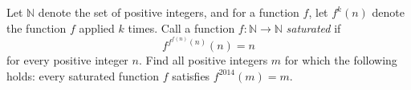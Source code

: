 Let $\mathbb N$ denote the set of positive integers, and for a function $f$, let $f^k(n)$ denote the function $f$ applied $k$ times. Call a function $f : \mathbb N \to \mathbb N$ \textit{saturated} if \[ f^{f^{f(n)}(n)}(n) = n \] for every positive integer $n$. Find all positive integers $m$ for which the following holds: every saturated function $f$ satisfies $f^{2014}(m) = m$.

